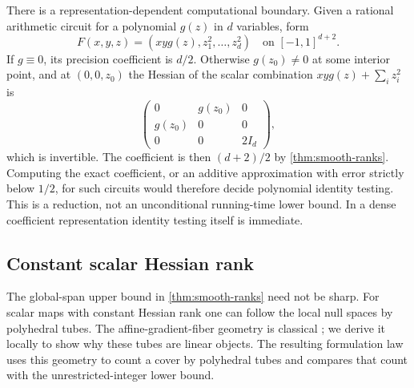 There is a representation-dependent computational boundary. Given a
rational arithmetic circuit for a polynomial $g(z)$ in $d$ variables,
form
\[
 F(x,y,z)=(xyg(z),z_1^2,\ldots,z_d^2)
 \quad\text{on }[-1,1]^{d+2}.
\]
If $g\equiv0$, its precision coefficient is $d/2$. Otherwise
$g(z_0)\ne0$ at some interior point, and at $(0,0,z_0)$ the Hessian of
the scalar combination $xyg(z)+\sum_i z_i^2$ is
\[
 \begin{pmatrix}0&g(z_0)&0\\g(z_0)&0&0\\0&0&2I_d\end{pmatrix},
\]
which is invertible. The coefficient is then $(d+2)/2$ by
\cref{thm:smooth-ranks}. Computing the exact coefficient, or an additive
approximation with error strictly below $1/2$, for such circuits would
therefore decide polynomial identity testing. This is a reduction, not
an unconditional running-time lower bound. In a dense coefficient
representation identity testing itself is immediate.

\subsection{Constant scalar Hessian rank}

The global-span upper bound in \cref{thm:smooth-ranks} need not be sharp.
For scalar maps with constant Hessian rank one can follow the local
null spaces by polyhedral tubes. The affine-gradient-fiber geometry is
classical \citep[Definition 1.1 and the following paragraph, pp.~208--209]{nicola2008};
we derive it locally to show why these tubes are linear objects.
The resulting formulation law uses this geometry to count a cover by
polyhedral tubes and compares that count with the unrestricted-integer
lower bound.

